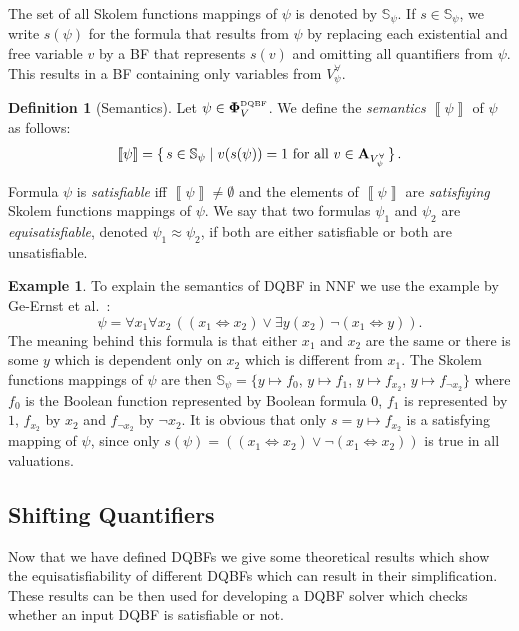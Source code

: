 \documentclass[
  digital, %
  twoside, %
  table,   %
  nolof,     %
  nolot,     %
]{fithesis3}
\let\setbuilder\set
\newcommand{\simpleset}[1]{\{{#1}\}}
\renewcommand{\set}[1]{\normalexpandarg\IfSubStr{#1}{|}{\setbuilder{#1}}{\simpleset{#1}}}
\theoremstyle{definition}
\newtheorem{definition}{Definition}
\newtheorem{example}{Example}
\theoremstyle{remark}
\newcommand{\seman}[1]{\left\llbracket {#1} \right\rrbracket}
\newcommand{\DQBF}[1]{\mathbf{\Phi}_{#1}^{\normalfont{\text{\tiny DQBF}}}}
\newcommand{\valtns}[1]{\mathbf{A}_{#1}}
\newcommand{\uvars}[1]{V_{#1}^{\forall}}
\newcommand{\Scands}[1]{\mathbb{S}_{#1}}
\newcommand{\lequal}{\Leftrightarrow}
\newcommand{\itholds}{\,}
\begin{document}
The set of all Skolem functions mappings of $\psi$ is denoted by $\Scands{\psi}$. If $s \in \Scands{\psi}$, we write $s(\psi)$ for the formula that results from $\psi$ by replacing each existential and free variable $v$ by a BF that represents $s(v)$ and omitting all quantifiers from $\psi$. This results in a BF containing only variables from $\uvars{\psi}$.

\begin{definition}[Semantics]
  Let $\psi \in \DQBF{V}$. We define the \emph{semantics} $\seman{\psi}$ of $\psi$ as follows:
  \[\seman{\psi} = \set{s \in \Scands{\psi} | v(s(\psi))=1 \text{ for all } v \in \valtns{\uvars{\psi}}}.\]
\end{definition}
Formula $\psi$ is \emph{satisfiable} iff $\seman{\psi} \not= \emptyset$ and the elements of $\seman{\psi}$ are \emph{satisfiying} Skolem functions mappings of $\psi$. We say that two formulas $\psi_1$ and $\psi_2$ are \emph{equisatisfiable}, denoted $\psi_1 \approx \psi_2$, if both are either satisfiable or both are unsatisfiable.
\begin{example}
\label{ex:DQBF:NNF}
To explain the semantics of DQBF in NNF we use the example by Ge-Ernst et al.~\cite{HQSquantifierLocalization}:
\[\psi = \forall x_1 \forall x_2\itholds ((x_1 \lequal x_2) \lor \exists y (x_2)\itholds \neg(x_1 \lequal y)).\]
The meaning behind this formula is that either $x_1$ and $x_2$ are the same or there is some $y$ which is dependent only on $x_2$ which is different from $x_1$. The Skolem functions mappings of $\psi$ are then $\Scands{\psi} = \{y\mapsto f_0$, $y\mapsto f_1$, $y\mapsto f_{x_2}$, $y\mapsto f_{\neg x_2}\}$ where $f_0$ is the Boolean function represented by Boolean formula $0$, $f_1$ is represented by $1$, $f_{x_2}$ by $x_2$ and $f_{\neg x_2}$ by $\neg x_2$. It is obvious that only $s = y \mapsto f_{x_2}$ is a satisfying mapping of $\psi$, since only $s(\psi) = ((x_1 \lequal x_2) \lor \neg(x_1 \lequal x_2))$ is true in all valuations.
\end{example}

\subsection{Shifting Quantifiers}
\label{sec:quantLocalization}
Now that we have defined DQBFs we give some theoretical results which show the equisatisfiability of different DQBFs which can result in their simplification. These results can be then used for developing a DQBF solver which checks whether an input DQBF is satisfiable or not.
\end{document}
